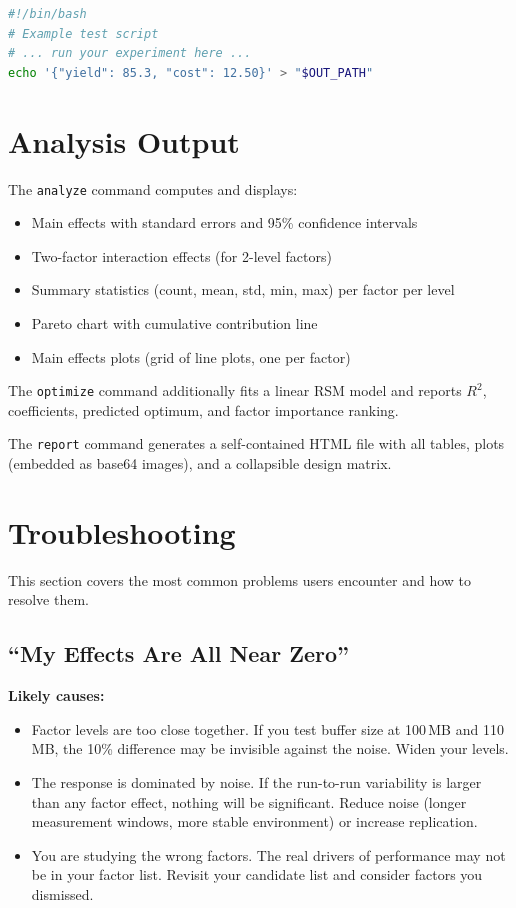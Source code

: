 \documentclass[11pt]{book}
\begin{document}
\begin{lstlisting}[language=bash]
#!/bin/bash
# Example test script
# ... run your experiment here ...
echo '{"yield": 85.3, "cost": 12.50}' > "$OUT_PATH"
\end{lstlisting}

\section{Analysis Output}

The \texttt{analyze} command computes and displays:
\begin{itemize}[nosep]
\item Main effects with standard errors and 95\% confidence intervals
\item Two-factor interaction effects (for 2-level factors)
\item Summary statistics (count, mean, std, min, max) per factor per level
\item Pareto chart with cumulative contribution line
\item Main effects plots (grid of line plots, one per factor)
\end{itemize}

The \texttt{optimize} command additionally fits a linear RSM model and reports
$R^2$, coefficients, predicted optimum, and factor importance ranking.

The \texttt{report} command generates a self-contained HTML file with all tables,
plots (embedded as base64 images), and a collapsible design matrix.


\section{Troubleshooting}

This section covers the most common problems users encounter and how to resolve
them.

\subsection{``My Effects Are All Near Zero''}

\textbf{Likely causes:}
\begin{itemize}[nosep]
\item Factor levels are too close together. If you test buffer size at 100\,MB
      and 110\,MB, the 10\% difference may be invisible against the noise. Widen
      your levels.
\item The response is dominated by noise. If the run-to-run variability is
      larger than any factor effect, nothing will be significant. Reduce noise
      (longer measurement windows, more stable environment) or increase
      replication.
\item You are studying the wrong factors. The real drivers of performance may
      not be in your factor list. Revisit your candidate list and consider
      factors you dismissed.
\end{itemize}
\end{document}
